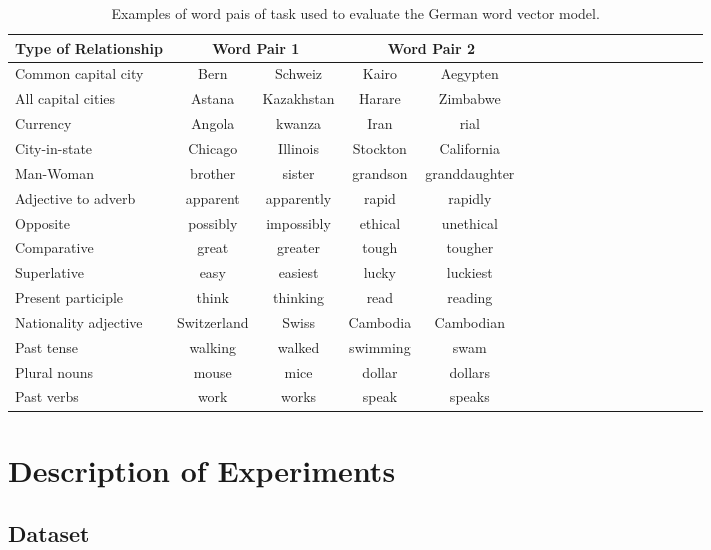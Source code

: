 \begin{table}[h]
  \centering
  \caption{Examples of word pais  of task  used  to evaluate the German word
    vector model. }
  \label{tab:task_deutsch_modified}

  \begin{tabular}{ |l| |c|*{4}{c| |c| c | c }  }

  \hline           
  Type of Relationship &  \multicolumn{2}{c||}{Word Pair 1} &
  \multicolumn{2}{c|}{Word Pair 2} \\  \hline           
  Common capital city & Bern &  Schweiz & Kairo  & Aegypten \\ 
  All capital cities  & Astana & Kazakhstan &  Harare & Zimbabwe  \\
  Currency & Angola & kwanza & Iran & rial \\  
  City-in-state  & Chicago & Illinois & Stockton & California \\  
  Man-Woman & brother & sister  & grandson & granddaughter \\  \hline  
  Adjective to adverb & apparent & apparently & rapid & rapidly  \\  
  Opposite & possibly & impossibly & ethical & unethical \\  
  Comparative & great & greater & tough & tougher \\  
  Superlative & easy & easiest & lucky & luckiest \\  
  Present participle & think & thinking & read & reading \\  
  Nationality adjective & Switzerland & Swiss & Cambodia  & Cambodian  \\  
  Past tense & walking & walked & swimming & swam \\ 
  Plural nouns  & mouse & mice & dollar & dollars \\  
  Past verbs & work & works & speak  & speaks  \\  \hline  
\end{tabular}
\end{table}






\section{Description of Experiments}
\label{sec:german_eng_experiments}

\subsection{Dataset}
\label{experiments:sub:dataset}

